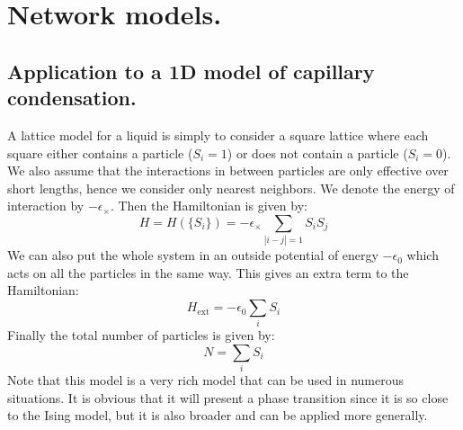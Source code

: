 \documentclass[10pt,a4paper]{book}
\begin{document}
\section{Network models.}
\subsection{Application to a 1D model of capillary condensation.}
A lattice model for a liquid is simply to consider a square lattice where each square either contains a particle ($S_i = 1$)  or does not contain a particle ($S_i = 0$). We also assume that the interactions in between particles are only effective over short lengths, hence we consider only nearest neighbors. We denote the energy of interaction by $-\epsilon_\times$. Then the Hamiltonian is given by:
\[
H = H(\{S_i\}) = -\epsilon_\times \sum_{|i - j| = 1} S_i S_j
\]
We can also put the whole system in an outside potential of energy $-\epsilon_0$ which acts on all the particles in the same way. This gives an extra term to the Hamiltonian:
\[
H_\text{ext} = - \epsilon_0 \sum_i S_i
\]
Finally the total number of particles is given by:
\[
N = \sum_i S_i
\]
Note that this model is a very rich model that can be used in numerous situations. It is obvious that it will present a phase transition since it is so close to the Ising model, but it is also broader and can be applied more generally.
\end{document}
